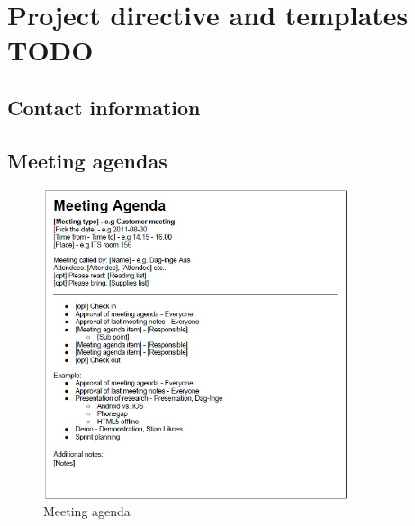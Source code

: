 \appendix

\section{Project directive and templates TODO}
	
	\subsection{Contact information}
	
	\subsection{Meeting agendas}
		\begin{figure}[htb]
			\centering
			\includegraphics[width=0.8\textwidth]{appendix/meeting_agenda.jpg}
			\caption{Meeting agenda}
			\label{fig:meeting-agenda}
		\end{figure}
	
	\newpage
